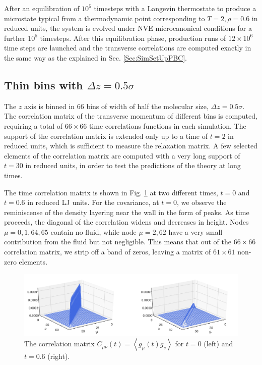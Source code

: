 \documentclass[a4paper,openright,12pt]{book}
\newcommand{\llangle}{\left\langle}
\newcommand{\rrangle}{\right\rangle}
\begin{document}
After an equilibration of $10^5$ timesteps with a Langevin thermostate
to   produce  a   microstate  typical   from  a   thermodynamic  point
corresponding  to  $T=2,\rho=0.6$ in  reduced  units,  the system  is
evolved  under  NVE microcanonical  conditions  for  a further  $10^5$
timesteps.  After this equilibration  phase, production runs of $12\times 10^6$
time steps are launched and the transverse correlations are computed exactly in the same way as the explained in Sec. \ref{Sec:SimSetUpPBC}.

\subsection{Thin bins with $\Delta z = 0.5\sigma$}
The $z$  axis is binned  in $66$ bins of  width of half  the molecular
size, $\Delta z=0.5\sigma$.  The  correlation matrix of the transverse
momentum of different bins is computed, requiring a total of $66\times
66$ time correlations  functions  in each  simulation.   
The support of  the correlation matrix  is extended only  up to a  time of
$t=2$ in reduced units, which  is sufficient to measure the relaxation
matrix.   A  few  selected  elements of  the  correlation  matrix  are
computed with a very long support of $t=30$ in reduced units, in order
to test the predictions of the theory at long times.

The time correlation  matrix is shown in  Fig.  \ref{fig:Ct-matrix-WALLS-66nodes} at
two different  times, $t=0$ and  $t=0.6$ in  reduced LJ units.   For the
covariance,  at $t=0$,  we  observe the  reminiscense  of the  density
layering near  the wall in the  form of peaks.  As  time proceeds, the
diagonal of  the correlation  widens and  decreases in  height.  Nodes
$\mu=0,1,64,65$ contain  no fluid, while  node $\mu=2,62$ have  a very
small  contribution  from  the  fluid but not negligible.  This means  that  out  of  the
$66\times66$ correlation matrix, we strip off a band of zeros, leaving
a matrix of $61\times61$ non-zero elements.

\begin{figure}[h!]
\centering
\includegraphics[scale=0.4]{Ct-matrix-WALLS-66nodes}
\caption[Correlation matrix $C(t)$ at $t=0$ and $t=0.6$ for confined fluid - 66 nodes.]{The   correlation    matrix   $C_{\mu\nu}(t)=\llangle
g_{\mu}(t)  g_\nu\rrangle$ for  $t=0$ (left) and $t=0.6$ (right).}
\label{fig:Ct-matrix-WALLS-66nodes}
\end{figure}
\end{document}
